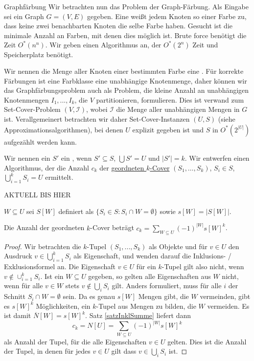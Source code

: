 \begin{section}{Graphfärbung}
  Wir betrachten nun das Problem der Graph-Färbung. Als Eingabe sei ein Graph \(G = (V,E)\) gegeben. Eine  weißt jedem Knoten so einer Farbe zu, dass keine zwei benachbarten Knoten die selbe Farbe haben. Gesucht ist die minimale Anzahl an Farben, mit denen dies möglich ist. Brute force benötigt die Zeit \( O^*(n^n) \). Wir geben einen Algorithmus an, der \(O^*(2^n)\) Zeit und Speicherplatz benötigt.
  
  Wir nennen die Menge aller Knoten einer bestimmten Farbe eine . Für korrekte Färbungen ist eine Farbklasse eine unabhängige Knotenmenge, daher können wir das Graphfärbungsproblem auch als Problem, die kleine Anzahl an unabhängigen Knotenmengen \(I_1,...,I_k\), die \(V\) partitionieren, formulieren. Dies ist verwand zum Set-Cover-Problem $(V, \mathcal{I})$, wobei \(\mathcal{I}\) die Menge aller unabhängigen Mengen in $G$ ist. Verallgemeinert betrachten wir daher Set-Cover-Instanzen $(U,S)$ (siehe Approximationsalgorithmen), bei denen $U$ explizit gegeben ist und $S$ in $O^*(2^{|U|})$ aufgezählt werden kann. 
  
  Wir nennen ein $S'$ ein , wenn $S' \subseteq S$, $\bigcup S' = U$ und $|S'| = k$. Wir entwerfen einen Algorithmus, der die Anzahl $c_k$ der \underline{geordneten $k$-Cover} $(S_1,\dots,S_k)$, $S_i \in S$, $\bigcup_{i=1}^k S_i = U$ ermittelt.
  
  AKTUELL BIS HIER
  
  \(W \subseteq U\) sei \(S[W]\) definiert als \( \{ S_i \in S : S_i \cap W = \emptyset \} \) sowie \(s[W] = |S[W]|\).
  
  \begin{lemma}
   Die Anzahl der geordneten $k$-Cover beträgt \(c_k = \sum_{W \subseteq U} (-1)^{ |W| } s[W]^k\).
  \end{lemma}

  
  \begin{proof}
    Wir betrachten die \(k\)-Tupel \( (S_1, ..., S_k) \) als Objekte und für \(v \in U\) den Ausdruck \(v \in \bigcup_{i=1}^k S_i\) als Eigenschaft, und wenden darauf die Inklusions- / Exklusionsformel an. Die Eigenschaft \(v \in U\) für ein \(k\)-Tupel gilt also nicht, wenn \(v \notin \cup_{i=1}^k S_i\). Ist ein \(W \subseteq U\) gegeben, so gelten alle Eigenschaften aus \(W\) nicht, wenn für alle \(v \in W\) stets \(v \notin \bigcup_i S_i\) gilt. Anders formuliert, muss für alle \(i\) der Schnitt \(S_i \cap W = \emptyset\) sein. Da es genau \(s[W]\) Mengen gibt, die \(W\) vermeinden, gibt es \(s[W]^k\) Möglichkeiten, ein \(k\)-Tupel aus Mengen zu bilden, die \(W\) vermeiden. Es ist damit \( \overline{N}[W] = s[W]^k\). Satz \ref{satzInklSumme} liefert dann \[c_k = N[U] = \sum_{W \subseteq U} (-1)^{ |W| } s[W]^k\] als Anzahl der Tupel, für die alle Eigenschaften \(v \in U\) gelten. Dies ist die Anzahl der Tupel, in denen für jedes \(v \in U\) gilt dass \(v \in \bigcup_i S_i\) ist.
  \end{proof}


\end{section}
